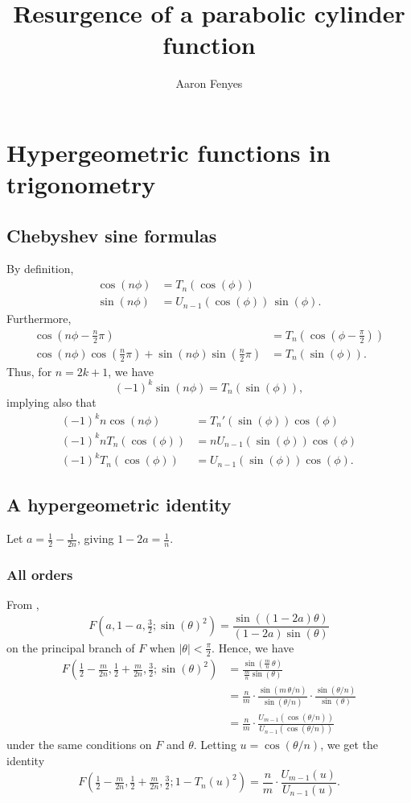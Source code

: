 \documentclass{article}
\title{Resurgence of a parabolic cylinder function}
\author{Aaron Fenyes}
\begin{document}
\maketitle
\section{Hypergeometric functions in trigonometry}
\subsection{Chebyshev sine formulas}
By definition,
\begin{align*}
\cos(n\phi) & = T_n(\cos(\phi)) \\
\sin(n\phi) & = U_{n-1}(\cos(\phi))\,\sin(\phi).
\end{align*}
Furthermore,
\begin{align*}
\cos(n\phi - \tfrac{n}{2}\pi) & = T_n(\cos(\phi - \tfrac{\pi}{2})) \\
\cos(n\phi) \cos(\tfrac{n}{2}\pi) + \sin(n\phi) \sin(\tfrac{n}{2}\pi) & = T_n(\sin(\phi)).
\end{align*}
Thus, for $n = 2k + 1$, we have
\[ (-1)^k \sin(n\phi) = T_n(\sin(\phi)), \]
implying also that
\begin{align*}
(-1)^k n \cos(n\phi) & = T_n'(\sin(\phi)) \cos(\phi) \\
(-1)^k n T_n(\cos(\phi)) & = nU_{n-1}(\sin(\phi)) \cos(\phi) \\
(-1)^k T_n(\cos(\phi)) & = U_{n-1}(\sin(\phi)) \cos(\phi).
\end{align*}
\subsection{A hypergeometric identity}
Let $a = \tfrac{1}{2} - \tfrac{1}{2n}$, giving $1 - 2a = \tfrac{1}{n}$.
\subsubsection{All orders}\label{all-orders}
From \cite[equation~15.4.16]{dlmf},
\[ F(a, 1-a, \tfrac{3}{2}; \sin(\theta)^2) = \frac{\sin((1-2a)\theta)}{(1-2a)\sin(\theta)} \]
on the principal branch of $F$ when $|\theta| < \frac{\pi}{2}$. Hence, we have
\begin{align*}
F\left(\tfrac{1}{2} - \tfrac{m}{2n}, \tfrac{1}{2} + \tfrac{m}{2n}, \tfrac{3}{2}; \sin(\theta)^2\right) & = \frac{\sin(\tfrac{m}{n}\,\theta)}{\tfrac{m}{n} \sin(\theta)} \\
& = \frac{n}{m} \cdot \frac{\sin(m\,\theta/n)}{\sin(\theta/n)} \cdot \frac{\sin(\theta/n)}{\sin(\theta)} \\
& = \frac{n}{m} \cdot \frac{U_{m-1}(\cos(\theta/n))}{U_{n-1}(\cos(\theta/n))}
\end{align*}
under the same conditions on $F$ and $\theta$. Letting $u = \cos(\theta/n)$, we get the identity
\[ F\left(\tfrac{1}{2} - \tfrac{m}{2n}, \tfrac{1}{2} + \tfrac{m}{2n}, \tfrac{3}{2}; 1 - T_n(u)^2\right) = \frac{n}{m} \cdot \frac{U_{m-1}(u)}{U_{n-1}(u)}. \]
\end{document}
